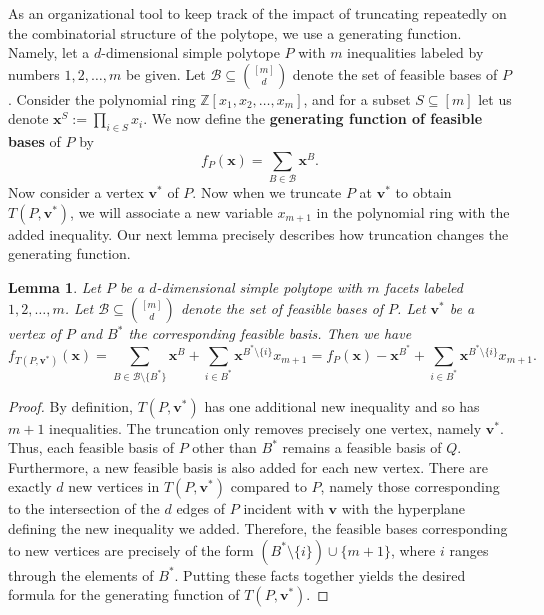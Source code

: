\documentclass[centering,11pt,reqno]{amsart}
\newtheorem{lem}[theorem]{Lemma}
\theoremstyle{definition}
\begin{document}
As an organizational tool to keep track of the impact of truncating repeatedly on the combinatorial structure of the polytope, we use a generating function. Namely, let a $d$-dimensional simple polytope $P$ with $m$ inequalities labeled by numbers $1, 2,\dots,m$ be given. Let $\mathcal{B}\subseteq \binom{[m]}{d}$ denote the set of feasible bases of $P$. Consider the polynomial ring $\mathbb{Z}[x_{1}, x_{2}, \dots, x_{m}]$, and for a subset $S \subseteq [m]$ let us denote $\mathbf{x}^{S} := \prod_{i \in S} x_{i}$. We now define the \textbf{generating function of feasible bases} of $P$ by 
\[f_{P}(\mathbf{x}) = \sum_{B \in \mathcal{B}} \mathbf{x}^{B}.\]
Now consider a vertex $\mathbf{v}^\ast$ of $P$. Now when we truncate $P$ at $\mathbf{v}^\ast$ to obtain $T(P,\mathbf{v}^\ast)$, we will associate a new variable $x_{m+1}$ in the polynomial ring with the added inequality. Our next lemma precisely describes how truncation changes the generating function.

\begin{lem}
\label{lem:firsttruncation}
Let $P$ be a $d$-dimensional simple polytope with $m$ facets labeled $1,2,\dots,m$. Let $\mathcal{B} \subseteq \binom{[m]}{d}$ denote the set of feasible bases of $P$. Let $\mathbf{v}^\ast$ be a vertex of $P$ and $B^{\ast}$ the corresponding feasible basis. Then we have
\[f_{T(P,\mathbf{v}^\ast)}(\mathbf{x}) = \sum_{B \in \mathcal{B} \setminus \{B^{\ast}\}} \mathbf{x}^{B} + \sum_{i \in B^{\ast}} \mathbf{x}^{B^\ast \setminus \{i\}} x_{m+1} = f_{P}(\mathbf{x}) - \mathbf{x}^{B^{\ast}} + \sum_{i \in B^{\ast}} \mathbf{x}^{B^{\ast} \setminus \{i\}} x_{m+1}. \]
\end{lem}

\begin{proof}
By definition, $T(P,\mathbf{v}^\ast)$ has one additional new inequality and so has $m+1$ inequalities. The truncation only removes precisely one vertex, namely $\mathbf{v}^\ast$. Thus, each feasible basis of $P$ other than $B^\ast$ remains a feasible basis of $Q$. Furthermore, a new feasible basis is also added for each new vertex. There are exactly $d$ new vertices in $T(P,\mathbf{v}^\ast)$ compared to $P$, namely those corresponding to the intersection of the $d$ edges of $P$ incident with $\mathbf{v}$ with the hyperplane defining the new inequality we added. Therefore, the feasible bases corresponding to new vertices are precisely of the form $(B^{\ast} \setminus \{i\}) \cup \{m+1\}$, where $i$ ranges through the elements of $B^\ast$. Putting these facts together yields the desired formula for the generating function of $T(P,\mathbf{v}^\ast)$. 
\end{proof}
\end{document}
